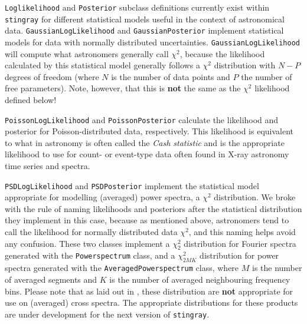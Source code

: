 \documentclass[twocolumn]{aastex62}
\newcommand{\stingray}{\texttt{stingray}\xspace}
\newcommand{\powerspectrum}{\texttt{Powerspectrum}\xspace}
\begin{document}

\texttt{Loglikelihood} and \texttt{Posterior} subclass definitions currently exist within \stingray for different statistical models useful in the context of astronomical data. 
\verb|GaussianLogLikelihood| and \texttt{GaussianPosterior} implement statistical models for data with normally distributed uncertainties. \texttt{GaussianLogLikelihood} will compute what astronomers generally call $\chi^2$, because the likelihood calculated by this statistical model generally follows a $\chi^2$ distribution with $N-P$ degrees of freedom (where $N$ is the number of data points and $P$ the number of free parameters). Note, however, that this is \textbf{not} the same as the $\chi^2$ likelihood defined below!

\texttt{PoissonLogLikelihood} and \texttt{PoissonPosterior} calculate the likelihood and posterior for Poisson-distributed data, respectively. This likelihood is equivalent to what in astronomy is often called the \textit{Cash statistic} \citep{cash1979} and is the appropriate likelihood to use for count- or event-type data often found in X-ray astronomy time series and spectra.

\texttt{PSDLogLikelihood} and \texttt{PSDPosterior} implement the statistical model appropriate for modelling (averaged) power spectra, a $\chi^2$ distribution. We broke with the rule of naming likelihoods and posteriors after the statistical distribution they implement in this case, because as mentioned above, astronomers tend to call the likelihood for normally distributed data $\chi^2$, and this naming helps avoid any confusion. These two classes implement a $\chi^2_2$ distribution for Fourier spectra generated with the \powerspectrum class, and a $\chi^2_{2MK}$ distribution for power spectra generated with the \texttt{AveragedPowerspectrum} class, where $M$ is the number of averaged segments and $K$ is the number of averaged neighbouring frequency bins. Please note that as laid out in \citet{huppenkothen2017}, these distribution are \textbf{not} appropriate for use on (averaged) cross spectra. The appropriate distributions for these products are under development for the next version of \stingray.
\end{document}
